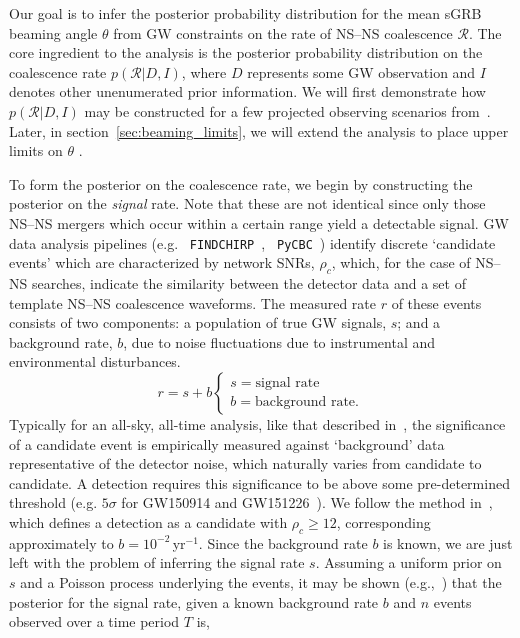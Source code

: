 \documentclass[twocolumn,nofootinbib]{revtex4-1}
\newcommand{\cbcrate}{{{\mathcal R}}}
\newcommand{\BNS}{\ac{NS}--\ac{NS}\xspace}
\newcommand{\arw}[1]{{\color{dgreen}{#1}}}
\begin{document}
Our goal is to infer the posterior probability distribution for the mean
\ac{sGRB} beaming angle $\theta$ from \ac{GW} constraints on the rate of \BNS
coalescence $\cbcrate$.  The core ingredient to the analysis is the posterior
probability distribution on the coalescence rate $p(\cbcrate|D,I)$, where $D$
represents some \ac{GW} observation and $I$ denotes other unenumerated prior
information.  We will first demonstrate how $p(\cbcrate|D,I)$ may be constructed
for a few projected observing scenarios from~\cite{Aasi:2013wya}.  Later, in
section~\ref{sec:beaming_limits}, we will extend the analysis to place upper
limits on $\theta$ \arw{based upon the lack of detection during O1}.

To form the posterior on the coalescence rate, we begin by constructing the
posterior on the \emph{signal} rate.  Note that these are not identical since
only those \BNS mergers which occur within a certain range yield a detectable
signal.  \ac{GW} data analysis pipelines (e.g. {\tt
FINDCHIRP}~\cite{2012PhRvD..85l2006A}, {\tt
PyCBC}~\cite{Canton:2014ena,Usman:2015kfa,alex_nitz_2016_197080}) identify
discrete `candidate events' which are characterized by network \acp{SNR},
$\rho_c$, which, for the case of \BNS searches, indicate the similarity between
the detector data and a set of template \BNS coalescence waveforms.  The
measured rate $r$ of these events consists of two components: a population of
true \ac{GW} signals, $s$; and a background rate, $b$, due to noise fluctuations
due to instrumental and environmental disturbances.
%
\begin{equation}
r = s + b
\begin{cases}
s = \text{signal rate} \\
b = \text{background rate}.
\end{cases}
\end{equation}
%
Typically for an all-sky, all-time analysis, like that described in~\cite{Usman:2015kfa}, the significance of a candidate event is empirically measured against `background' data representative of the detector noise, which naturally varies from candidate to candidate.
A detection requires this significance to be above some pre-determined threshold (e.g. $5\sigma$ for GW150914 and GW151226~\cite{Abbott:2016blz,Abbott:2016nmj}).
We follow the method in~\cite{Aasi:2013wya}, which defines a detection as a candidate with $\rho_c \geq 12$, corresponding approximately to $b=10^{-2}$\,yr$^{-1}$.
Since the background rate $b$ is known, we are just left with the problem of inferring the signal rate $s$.
Assuming a uniform prior on $s$ and a Poisson process underlying the events, it may be shown (e.g.,~\cite{2010blda.book.....G}) that the posterior for the signal rate, given a known background rate $b$ and $n$ events observed over a time period $T$ is,
\end{document}
